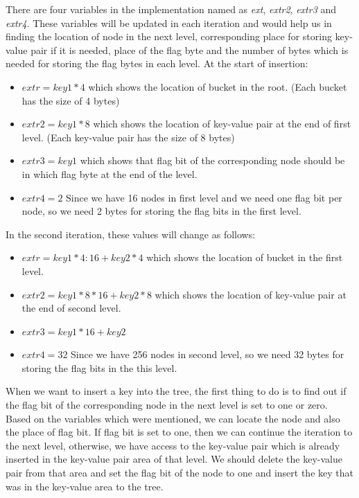\documentclass[12pt]{report}
\begin{document}
There are four variables in the implementation named as \textit{ext}, \textit{extr2}, \textit{extr3} and \textit{extr4}. These variables will be updated in each iteration and would help us in finding the location of node in the next level, corresponding place for storing key-value pair if it is needed, place of the flag byte and the number of bytes which is needed for storing the flag bytes in each level. At the start of insertion:

\begin{itemize}
\item $extr=key1*4$ which shows the location of bucket in the root. (Each bucket has the size of 4 bytes)
\item $extr2=key1*8$ which shows the location of key-value pair at the end of first level. (Each key-value pair has the size of 8 bytes) 
\item $extr3=key1$ which shows that flag bit of the corresponding node should be in which flag byte at the end of the level.
\item $extr4=2$ Since we have 16 nodes in first level and we need one flag bit per node, so we need 2 bytes for storing the flag bits in the first level.
\end{itemize} 

In the second iteration, these values will change as follows:

\begin{itemize}
\item $extr=key1*4:16+key2*4$ which shows the location of bucket in the first level. 
\item $extr2=key1*8*16+key2*8$ which shows the location of key-value pair at the end of second level. 
\item $extr3=key1*16+key2$
\item $extr4=32$ Since we have 256 nodes in second level, so we need 32 bytes for storing the flag bits in the this level.
\end{itemize}

When we want to insert a key into the tree, the first thing to do is to find out if the flag bit of the corresponding node in the next level is set to one or zero. Based on the variables which were mentioned, we can locate the node and also the place of flag bit. If flag bit is set to one, then we can continue the iteration to the next level, otherwise, we have access to the key-value pair which is already inserted in the key-value pair area of that level. We should delete the key-value pair from that area and set the flag bit of the node to one and insert the key that was in the key-value area to the tree.
\end{document}
